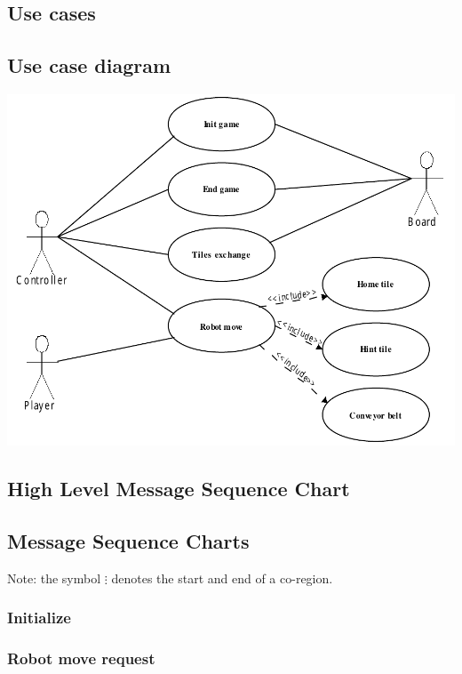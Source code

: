 \subsection{Use cases}
	
\subsection{Use case diagram}
	\includegraphics[width=\linewidth]{usecases/diagram.pdf}	

\subsection{High Level Message Sequence Chart}
    
	
\subsection{Message Sequence Charts}
	Note: the symbol $\vdots$ denotes the start and end of a co-region.

	\subsubsection{Initialize}
    
    	
	\subsubsection{Robot move request}
	


